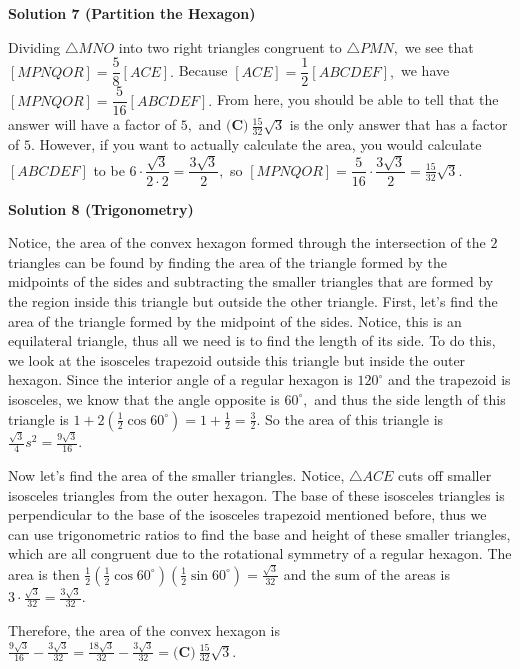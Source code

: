 \begin{enumerate}
 



\textbf{Solution 7 (Partition the Hexagon)}

Dividing $\triangle MNO$ into two right triangles congruent to $\triangle PMN,$ we see that $[MPNQOR]=\dfrac{5}{8}[ACE].$ Because $[ACE] = \dfrac{1}{2}[ABCDEF],$ we have $[MPNQOR]=\dfrac{5}{16}[ABCDEF].$ From here, you should be able to tell that the answer will have a factor of $5,$ and $\boxed{\textbf{(C)}\ \frac {15}{32}\sqrt{3}}$ is the only answer that has a factor of $5.$ However, if you want to actually calculate the area, you would calculate $[ABCDEF]$ to be $6 \cdot \dfrac{\sqrt{3}}{2 \cdot 2} = \dfrac{3\sqrt{3}}{2},$ so $[MPNQOR] = \dfrac{5}{16} \cdot \dfrac{3\sqrt{3}}{2} = \frac {15}{32}\sqrt{3}.$




\textbf{Solution 8 (Trigonometry)}

Notice, the area of the convex hexagon formed through the intersection of the $2$ triangles can be found by finding the area of the triangle formed by the midpoints of the sides and subtracting the smaller triangles that are formed by the region inside this triangle but outside the other triangle. First, let's find the area of the triangle formed by the midpoint of the sides. Notice, this is an equilateral triangle, thus all we need is to find the length of its side. To do this, we look at the isosceles trapezoid outside this triangle but inside the outer hexagon. Since the interior angle of a regular hexagon is $120^\circ$ and the trapezoid is isosceles, we know that the angle opposite is $60^\circ,$ and thus the side length of this triangle is $1+2\left(\frac{1}{2}\cos 60^\circ\right)=1+\frac{1}{2}=\frac{3}{2}.$ So the area of this triangle is $\frac{\sqrt{3}}{4}s^2=\frac{9\sqrt{3}}{16}.$

 Now let's find the area of the smaller triangles. Notice, $\triangle ACE$ cuts off smaller isosceles triangles from the outer hexagon. The base of these isosceles triangles is perpendicular to the base of the isosceles trapezoid mentioned before, thus we can use trigonometric ratios to find the base and height of these smaller triangles, which are all congruent due to the rotational symmetry of a regular hexagon. The area is then $\frac{1}{2}\left(\frac{1}{2}\cos 60^\circ\right)\left(\frac{1}{2}\sin 60^\circ\right)=\frac{\sqrt{3}}{32}$ and the sum of the areas is $3\cdot \frac{\sqrt{3}}{32}=\frac{3\sqrt{3}}{32}.$

 Therefore, the area of the convex hexagon is $\frac{9\sqrt{3}}{16}-\frac{3\sqrt{3}}{32}=\frac{18\sqrt{3}}{32}-\frac{3\sqrt{3}}{32}=\boxed{\textbf{(C)}\ \frac {15}{32}\sqrt{3}}.$





\end{enumerate}
